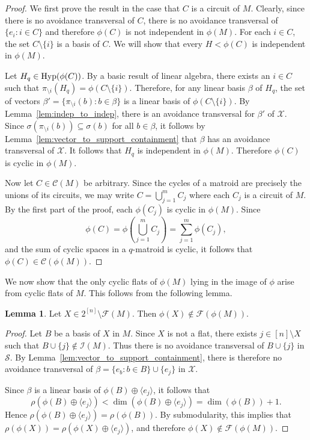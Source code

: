 \documentclass{article}
\theoremstyle{definition}
\newtheorem{lemma}[theorem]{{{Lemma}}}
\begin{document}
\begin{proof}
    We first prove the result in the case that $C$ is a circuit of $M$. Clearly, since there is no avoidance transversal of $C$, there is no avoidance transversal of $\{e_i:i\in C\}$ and therefore $\phi(C)$ is not independent in $\phi(M)$. For each $i\in C$, the set $C\setminus\{i\}$ is a basis of $C$. We will show that every $H<\phi(C)$ is independent in $\phi(M)$.
    
    Let $H_q\in\textup{Hyp}(\phi(C))$.
    By a basic result of linear algebra, there exists an $i\in C$ such that $\pi_{\setminus i}(H_q)=\phi(C\setminus\{i\})$. Therefore, for any linear basis $\beta$ of $H_q$, the set of vectors $\beta'=\{\pi_{\setminus i}(b):b\in\beta\}$ is a linear basis of $\phi(C\setminus\{i\})$. By Lemma~\ref{lem:indep_to_indep}, there is an avoidance transversal for $\beta'$ of $\mathcal{X}$. Since $\sigma(\pi_{\setminus i}(b))\subseteq\sigma(b)$ for all $b\in\beta$, it follows by Lemma~\ref{lem:vector_to_support_containment} that $\beta$ has an avoidance transversal of $\mathcal{X}$. It follows that $H_q$ is independent in $\phi(M)$. Therefore $\phi(C)$ is cyclic in $\phi(M)$.

    Now let $C\in\mathcal{C}(M)$ be arbitrary. Since the cycles of a matroid are precisely the unions of its circuits, we may write $C=\bigcup_{j=1}^m C_j$ where each $C_j$ is a circuit of $M$. By the first part of the proof, each $\phi(C_j)$ is cyclic in $\phi(M)$. Since
    \[
        \phi(C)=\phi\left(\bigcup_{j=1}^m C_j\right)=\sum_{j=1}^m \phi(C_j),
    \]
    and the sum of cyclic spaces in a $q$-matroid is cyclic, it follows that $\phi(C)\in\mathcal{C}(\phi(M))$.
\end{proof}

We now show that the only cyclic flats of $\phi(M)$ lying in the image of $\phi$ arise from cyclic flats of $M$. This follows from the following lemma.

\begin{lemma}
    Let $X\in 2^{[n]}\setminus\mathcal{F}(M)$. Then $\phi(X)\notin\mathcal{F}(\phi(M))$.
\end{lemma}

\begin{proof}
    Let $B$ be a basis of $X$ in $M$. Since $X$ is not a flat, there exists $j\in[n]\setminus X$ such that $B\cup\{j\}\notin\mathcal{I}(M)$. Thus there is no avoidance transversal of $B\cup\{j\}$ in $\mathcal{S}$. By Lemma~\ref{lem:vector_to_support_containment}, there is therefore no avoidance transversal of
    $\beta=\{e_b:b\in B\}\cup\{e_j\}$
    in $\mathcal{X}$.

    Since $\beta$ is a linear basis of $\phi(B)\oplus\langle e_j\rangle$, it follows that
    \[
        \rho(\phi(B)\oplus\langle e_j\rangle)
        < \dim(\phi(B)\oplus\langle e_j\rangle)
        = \dim(\phi(B))+1.
    \]
    Hence $\rho(\phi(B)\oplus\langle e_j\rangle)=\rho(\phi(B))$. By submodularity, this implies that
    $\rho(\phi(X))=\rho(\phi(X)\oplus\langle e_j\rangle)$,
    and therefore $\phi(X)\notin\mathcal{F}(\phi(M))$.
\end{proof}
\end{document}
